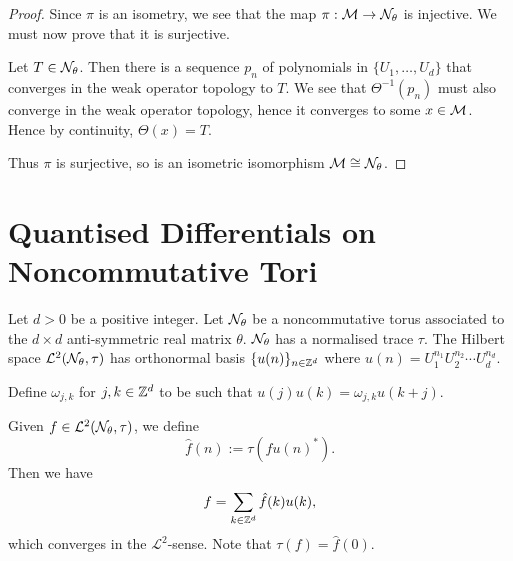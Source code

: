 \begin{proof}
    Since $\pi$ is an isometry, we see that the map $\pi:\mathcal{M}\to \mathcal{N}_\theta$
    is injective. We must now prove that it is surjective. 
    
    Let $T \in \mathcal{N}_\theta$. Then there is a sequence $p_n$ of polynomials in $\{U_1,\ldots,U_d\}$
    that converges in the weak operator topology to $T$. We
    see that $\Theta^{-1}(p_n)$ must also converge in the weak operator topology,
    hence it converges to some $x \in \mathcal{M}$. Hence by continuity, $\Theta(x) = T$.
    
    Thus $\pi$ is surjective, so is an isometric isomorphism $\mathcal{M} \cong \mathcal{N}_\theta$.
    
\end{proof}

\section{Quantised Differentials on Noncommutative Tori}

Let $d > 0$ be a positive integer. 
Let $\mathcal{N}_{\theta}$ be a noncommutative torus
associated to the $d\times d$ anti-symmetric real matrix $\theta$.
$\mathcal{N}_\theta$ has a normalised trace $\tau$.
The Hilbert space $\mathcal{L}^2(\mathcal{N}_\theta,\tau)$ 
has orthonormal basis $\{u(n)\}_{n \in \mathbb{Z}^d}$ where $u(n) = U_1^{n_1}U_2^{n_2}\cdots U_d^{n_d}$.

Define $\omega_{j,k}$ for $j,k \in \mathbb{Z}^d$ to be such
that $u(j)u(k) = \omega_{j,k}u(k+j)$.

Given $f \in \mathcal{L}^2(\mathcal{N}_\theta,\tau)$, we define
\begin{equation}
    \hat{f}(n) := \tau(fu(n)^*).
\end{equation}
Then we have
\begin{equation}
    f = \sum_{k \in \mathbb{Z}^d} \hat{f}(k)u(k),
\end{equation}
which converges in the $\mathcal{L}^2$-sense. Note that $\tau(f) = \hat{f}(0)$.

